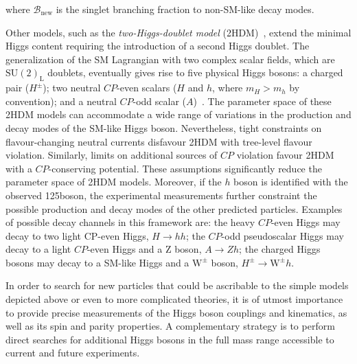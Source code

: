 where $\mathcal{B}_\mathrm{new}$ is the singlet branching fraction to non-SM-like decay modes.

Other models, such as the \emph{two-Higgs-doublet model} (2HDM)~\cite{Branco:2011iw}, extend the minimal Higgs content requiring the introduction of a second Higgs doublet. 
The generalization of the SM Lagrangian with two complex scalar fields, which are $\mathrm{SU(2)_L}$ doublets, eventually gives rise to five physical Higgs bosons: a charged pair ($H^{\pm}$); two neutral $CP$-even scalars ($H$ and $h$, where $m_{H}>m_{h}$ by convention); and a neutral $CP$-odd scalar ($A$)~\cite{Craig:2013hca}. The parameter space of these 2HDM models can accommodate a wide range of variations in the production and decay modes of the SM-like Higgs boson. Nevertheless, tight constraints on flavour-changing neutral currents disfavour 2HDM with tree-level flavour violation. Similarly, limits on additional sources of $CP$ violation favour 2HDM with a $CP$-conserving potential. These assumptions significantly reduce the parameter space of 2HDM models. Moreover, if the $h$ boson is identified with the observed 125\GeV boson, the experimental measurements further constraint the possible production and decay modes of the other predicted particles. Examples of possible decay channels in this framework are: the  heavy  $CP$-even  Higgs  may  decay  to  two  light  CP-even  Higgs, $H \to hh$; the $CP$-odd pseudoscalar Higgs may decay to a light $CP$-even Higgs and a Z boson, $A \to Zh$; the charged Higgs bosons may decay to a SM-like Higgs and a $\mathrm{W}^\pm$ boson, $H^\pm \to \mathrm{W}^\pm h$.

In order to search for new particles that could be ascribable to the simple models depicted above or even to more complicated theories, it is of utmost importance to provide precise measurements of the Higgs boson couplings and kinematics, as well as its spin and parity properties. A complementary strategy is to perform direct searches for additional Higgs bosons in the full mass range accessible to current and future experiments.
